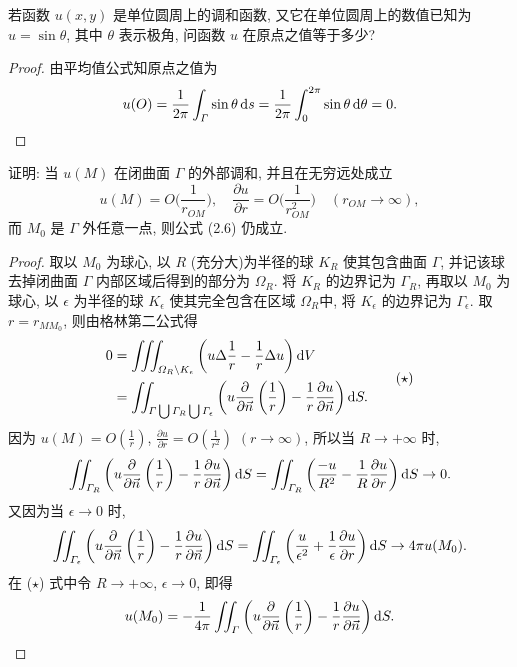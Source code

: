 \begin{exercise}
  若函数 $u(x,y)$ 是单位圆周上的调和函数, 又它在单位圆周上的数值已知为 $u=\sin\theta$,
  其中 $\theta$ 表示极角, 问函数 $u$ 在原点之值等于多少?
\end{exercise}

\begin{proof}
  由平均值公式知原点之值为
  \[u(O) = \frac{1}{2\pi}\int_{\varGamma}\sin\theta\mathop{}\!\mathrm{d} s
    = \frac{1}{2\pi}\int_0^{2\pi}\sin\theta\mathop{}\!\mathrm{d}\theta = 0.\qedhere\]
\end{proof}


\begin{exercise}[4]
  证明: 当 $u(M)$ 在闭曲面 $\varGamma$ 的外部调和, 并且在无穷远处成立
  \[u(M) = O\biggl(\frac{1}{r_{OM}}\biggr),\quad
    \frac{\partial u}{\partial r} = O\biggl(\frac{1}{r_{OM}^2}\biggr)\quad
    (r_{OM}\to\infty),\]
  而 $M_0$ 是 $\varGamma$ 外任意一点, 则公式 (2.6) 仍成立.
\end{exercise}

\begin{proof}
  取以 $M_0$ 为球心, 以 $R$ (充分大)为半径的球 $K_R$ 使其包含曲面 $\varGamma$,
  并记该球去掉闭曲面 $\varGamma$ 内部区域后得到的部分为 $\varOmega_R$. 将 $K_R$ 的边界记为 $\varGamma_R$,
  再取以 $M_0$ 为球心, 以 $\epsilon$ 为半径的球 $K_{\epsilon}$ 使其完全包含在区域 $\varOmega_R$中,
  将 $K_{\epsilon}$ 的边界记为 $\varGamma_{\epsilon}$.
  取 $r=r_{MM_0}$, 则由格林第二公式得
  \begin{equation}
    \begin{aligned}
    0 & = \iiint_{\varOmega_R\setminus K_{\epsilon}}\left(u\Delta\frac{1}{r}
        - \frac{1}{r}\Delta u\right)\mathop{}\!\mathrm{d} V \\
      & = \iint_{\varGamma\bigcup\varGamma_R\bigcup\varGamma_{\epsilon}}\left(u\frac{\partial}{\partial\vec{n}}\left(\frac{1}{r}\right)-\frac{1}{r}\frac{\partial u}{\partial\vec{n}}\right)\mathop{}\!\mathrm{d} S.
    \end{aligned} \tag{$\star$}
  \end{equation}
  因为 $u(M)=O(\frac{1}{r})$, $\frac{\partial u}{\partial r}=O(\frac{1}{r^2})$ $(r\to\infty)$,
  所以当 $R\to +\infty$ 时,
  \[\iint_{\varGamma_R}\left(u\frac{\partial}{\partial\vec{n}}\left(\frac{1}{r}\right)
    - \frac{1}{r}\frac{\partial u}{\partial\vec{n}}\right)\mathop{}\!\mathrm{d} S
    = \iint_{\varGamma_R}\left(\frac{-u}{R^2}-\frac{1}{R}\frac{\partial u}{\partial r}\right)\mathop{}\!\mathrm{d} S\to 0.\]
  又因为当 $\epsilon\to 0$ 时,
  \[\iint_{\varGamma_{\epsilon}}\left(u\frac{\partial}{\partial\vec{n}}\left(\frac{1}{r}\right)
    - \frac{1}{r}\frac{\partial u}{\partial\vec{n}}\right)\mathop{}\!\mathrm{d} S
    = \iint_{\varGamma_{\epsilon}}\left(\frac{u}{\epsilon^2}
    + \frac{1}{\epsilon}\frac{\partial u}{\partial r}\right)\mathop{}\!\mathrm{d} S
    \to 4\pi u(M_0).\]
  在 ($\star$) 式中令 $R\to +\infty$, $\epsilon\to 0$, 即得
  \[u(M_0)
  =-\frac{1}{4\pi}\iint_{\varGamma}\left(u\frac{\partial}{\partial\vec{n}}\left(\frac{1}{r}\right)
  -\frac{1}{r}\frac{\partial u}{\partial\vec{n}}\right)\mathop{}\!\mathrm{d} S. \qedhere\]
\end{proof}



